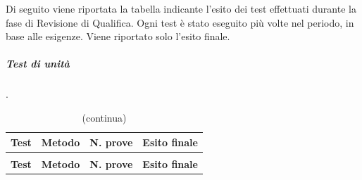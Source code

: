 		Di seguito viene riportata la tabella indicante l'esito dei test effettuati durante la fase di Revisione di Qualifica. Ogni test è stato eseguito più volte nel periodo, in base alle esigenze. Viene riportato solo l'esito finale.
		
		\subparagraph{Test di unità} {\color{white}.}
		
\renewcommand{\arraystretch}{1.5}
	
	\begin{longtable}{ >{\centering}p{}  >{\centering}p{} >{\centering}p{}
			>{\centering}p{}}
			
		\caption{   Esito test di unità - RQ}\\	
		\rowcolorhead
		\centering\textbf{\color{white}Test} 
		& \centering\textbf{\color{white}Metodo} 
		& \centering\textbf{\color{white}N. prove}
		& \centering\textbf{\color{white}Esito finale}
		
		\tabularnewline %
		\endfirsthead	
		
		\rowcolor{white}\caption[]{(continua)}\\	
		\rowcolorhead
		\centering\textbf{\color{white}Test} 
		& \centering\textbf{\color{white}Metodo} 
		& \centering\textbf{\color{white}N. prove}
		& \centering\textbf{\color{white}Esito finale}
		
		\tabularnewline %
		\endhead	
		

\end{longtable}
